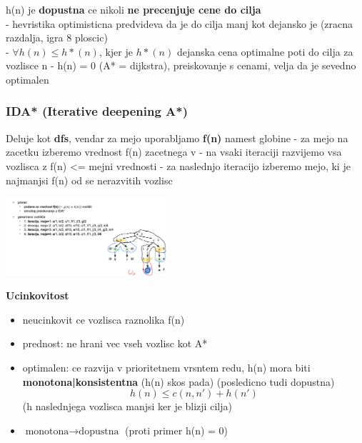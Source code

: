 h(n) je \textbf{dopustna} ce nikoli \textbf{ne precenjuje cene do cilja}\\
- hevristika optimisticna predvideva da je do cilja manj kot dejansko je (zracna razdalja, igra 8 ploscic)\\
- $\forall h(n)\leq h*(n)$, kjer je $h*(n)$ dejanska cena optimalne poti do cilja za vozlisce n
- h(n) = 0 (A* = dijkstra), preiskovanje s cenami, velja da je sevedno optimalen


\subsubsection{IDA* (Iterative deepening A*)}
Deluje kot \textbf{dfs}, vendar za mejo uporabljamo \textbf{f(n)} namest globine
- za mejo na zacetku izberemo vrednost f(n) zacetnega v
- na vsaki iteraciji razvijemo vsa vozlisca z f(n) <= mejni vrednosti
- za naslednjo iteracijo izberemo mejo, ki je najmanjsi f(n) od se nerazvitih vozlisc

\includegraphics[width=6cm]{./images/ida*.png}

\textbf{Ucinkovitost}
\begin{itemize}[noitemsep,topsep=0pt,leftmargin=*]
    \item neucinkovit ce vozlisca raznolika f(n)
    \item prednost: ne hrani vec vseh vozlisc kot A*
    \item optimalen: ce razvija v prioritetnem vrsntem redu, h(n) mora biti \textbf{monotona|konsistentna} (h(n) skos pada) (posledicno tudi dopustna) $$h(n) \leq c(n,n') + h(n')$$ (h naslednjega vozlisca manjsi ker je blizji cilja)
    \item $\text{monotona} \rightarrow \text{dopustna}$ (proti primer h(n) = 0)
\end{itemize}


